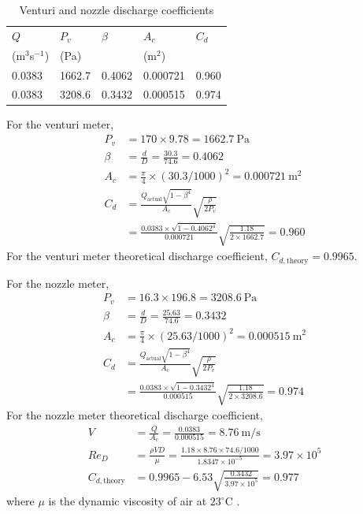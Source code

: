 \begin{table}[h]
    \centering
    \caption{Venturi and nozzle discharge coefficients}
    \label{tab:venturi_and_nozzle_discharge_coefficients}
    \begin{tabular}{p{2cm}p{2cm}p{2cm}p{2cm}p{2cm}}
        \toprule
        $Q$ & $P_v$ & $\beta$ & $A_c$ & $C_d$ \\
        (m$^3$s$^{-1}$) & (Pa) & & (m$^2$) & \\
        \midrule
        0.0383 & 1662.7 & 0.4062 & 0.000721 & 0.960 \\
        0.0383 & 3208.6 & 0.3432 & 0.000515 & 0.974 \\
        \bottomrule
    \end{tabular}
\end{table}

For the venturi meter, 
\begin{align*}
    P_v &= 170 \times 9.78 = \qty{1662.7}{\pascal} \\
    \beta &= \frac{d}{D} = \frac{30.3}{74.6} = 0.4062 \\
    A_c &= \frac{\pi}{4} \times \left(30.3/1000\right)^2 = \qty{0.000721}{\meter\squared} \\
    C_d &= \frac{Q_{\text{actual}}\sqrt{1 - \beta^4}}{A_c} \sqrt{\frac{\rho}{2 P_v}} \\
    &= \frac{0.0383 \times \sqrt{1 - 0.4062^4}}{0.000721}\sqrt{\frac{1.18}{2 \times 1662.7}} = \boxed{0.960}
\end{align*}
For the venturi meter theoretical discharge coefficient, $C_{d, \text{theory}} = 0.9965$.

For the nozzle meter,
\begin{align*}
    P_v &= 16.3 \times 196.8 = \qty{3208.6}{\pascal} \\
    \beta &= \frac{d}{D} = \frac{25.63}{74.6} = 0.3432 \\
    A_c &= \frac{\pi}{4} \times \left(25.63/1000\right)^2 = \qty{0.000515}{\meter\squared} \\
    C_d &= \frac{Q_{\text{actual}}\sqrt{1 - \beta^4}}{A_c} \sqrt{\frac{\rho}{2 P_v}} \\
    &= \frac{0.0383 \times \sqrt{1 - 0.3432^4}}{0.000515}\sqrt{\frac{1.18}{2 \times 3208.6}} = \boxed{0.974}
\end{align*}
For the nozzle meter theoretical discharge coefficient, 
\begin{align*}
    V &= \frac{Q}{A_c} = \frac{0.0383}{0.000515} = \qty{8.76}{\meter\per\second} \\
    Re_D &= \frac{\rho V D}{\mu} = \frac{1.18 \times 8.76 \times 74.6/1000}{1.8347 \times 10^{-5}} = 3.97 \times 10^5 \\
    C_{d, \text{theory}} &= 0.9965 - 6.53 \sqrt{\frac{0.3432}{3.97 \times 10^5}} = \boxed{0.977}
\end{align*}
where $\mu$ is the dynamic viscosity of air at $23^\circ$C \cite{bond_viscosity_1937}.

